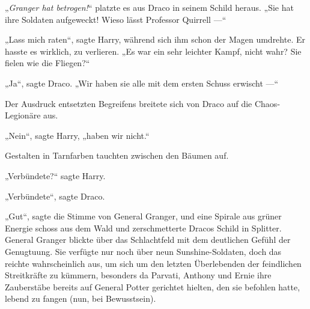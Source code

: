 „\emph{Granger hat betrogen!}“ platzte es aus Draco in seinem Schild heraus.
„Sie hat ihre Soldaten aufgeweckt! Wieso lässt Professor Quirrell —“

„Lass mich raten“, sagte Harry, während sich ihm schon der Magen umdrehte. Er hasste es wirklich, zu verlieren.
„Es war ein sehr leichter Kampf, nicht wahr? Sie fielen wie die Fliegen?“

„Ja“, sagte Draco.
„Wir haben sie alle mit dem ersten Schuss erwischt —“

Der Ausdruck entsetzten Begreifens breitete sich von Draco auf die Chaos-Legionäre aus.

„Nein“, sagte Harry, „haben wir nicht.“

Gestalten in Tarnfarben tauchten zwischen den Bäumen auf.

„Verbündete?“ sagte Harry.

„Verbündete“, sagte Draco.

„Gut“, sagte die Stimme von General Granger, und eine Spirale aus grüner Energie schoss aus dem Wald und zerschmetterte Dracos Schild in Splitter.
General Granger blickte über das Schlachtfeld mit dem deutlichen Gefühl der Genugtuung. Sie verfügte nur noch über neun Sunshine-Soldaten, doch das reichte wahrscheinlich aus, um sich um den letzten Überlebenden der feindlichen Streitkräfte zu kümmern, besonders da Parvati, Anthony und Ernie ihre Zauberstäbe bereits auf General Potter gerichtet hielten, den sie befohlen hatte, lebend zu fangen (nun, bei Bewusstsein).

